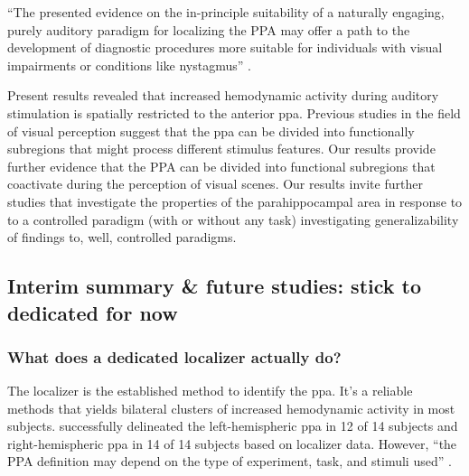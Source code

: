 %
``The presented evidence on the in-principle suitability of a naturally
engaging, purely auditory paradigm for localizing the PPA may offer a path to
the development of diagnostic procedures more suitable for individuals with
visual impairments or conditions like nystagmus''
\citep{haeusler2022processing}.

%
Present results revealed that increased hemodynamic activity during auditory
stimulation is spatially restricted to the anterior \ac{ppa}.
Previous studies in the field of visual perception suggest that the \ac{ppa} can
be divided into functionally subregions that might process different stimulus
features.
Our results provide further evidence that the PPA can be divided into functional
subregions that coactivate during the perception of visual scenes.
%
Our results invite further studies that investigate the properties of the
parahippocampal area in response to to a controlled paradigm (with or without
any task) investigating generalizability of findings to, well, controlled
paradigms.



\subsection{Interim summary \& future studies: stick to dedicated for now}




\subsubsection{What does a dedicated localizer actually do?}







%
The localizer is the established method to identify the \ac{ppa}.
It's a reliable methods that yields bilateral clusters of increased hemodynamic
activity in most subjects.
%
\citet{sengupta2016extension} successfully delineated the left-hemispheric
\ac{ppa} in 12 of 14 subjects and right-hemispheric \ac{ppa} in 14 of 14
subjects based on localizer data.
%
However, ``the PPA definition may depend on the type of experiment, task, and
stimuli used'' \citep{weiner2018defining}.


